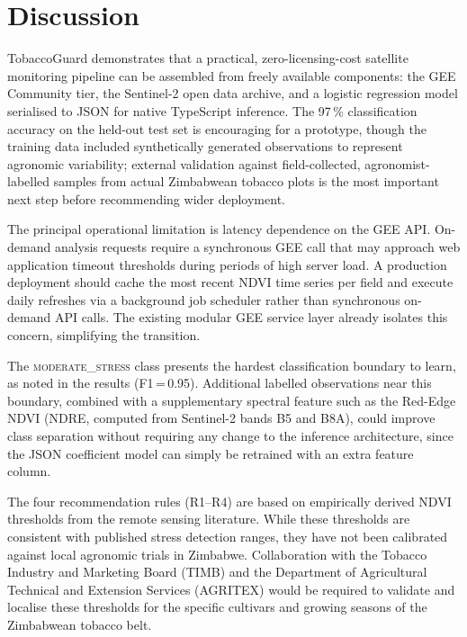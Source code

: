 \documentclass[conference]{IEEEtran}
\begin{document}
\section{Discussion}

TobaccoGuard demonstrates that a practical, zero-licensing-cost satellite
monitoring pipeline can be assembled from freely available components:
the GEE Community tier, the Sentinel-2 open data archive, and a logistic
regression model serialised to JSON for native TypeScript inference. The
97\,\% classification accuracy on the held-out test set is encouraging
for a prototype, though the training data included synthetically generated
observations to represent agronomic variability; external validation
against field-collected, agronomist-labelled samples from actual
Zimbabwean tobacco plots is the most important next step before
recommending wider deployment.

The principal operational limitation is latency dependence on the GEE
API. On-demand analysis requests require a synchronous GEE call that
may approach web application timeout thresholds during periods of high
server load. A production deployment should cache the most recent NDVI
time series per field and execute daily refreshes via a background job
scheduler rather than synchronous on-demand API calls.  The existing
modular GEE service layer already isolates this concern, simplifying the
transition.

The \textsc{moderate\_stress} class presents the hardest classification
boundary to learn, as noted in the results (F1\,=\,0.95). Additional
labelled observations near this boundary, combined with a supplementary
spectral feature such as the Red-Edge NDVI (NDRE, computed from Sentinel-2
bands B5 and B8A), could improve class separation without requiring any
change to the inference architecture, since the JSON coefficient model can
simply be retrained with an extra feature column.

The four recommendation rules (R1--R4) are based on empirically derived
NDVI thresholds from the remote sensing literature. While these
thresholds are consistent with published stress detection ranges, they
have not been calibrated against local agronomic trials in Zimbabwe.
Collaboration with the Tobacco Industry and Marketing Board (TIMB) and
the Department of Agricultural Technical and Extension Services (AGRITEX)
would be required to validate and localise these thresholds for the
specific cultivars and growing seasons of the Zimbabwean tobacco belt.
\end{document}
